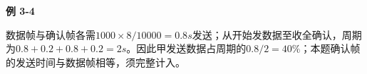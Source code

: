 {\color{ink}\bfseries 例 3-4}\par\vspace{1bp}数据帧与确认帧各需\(1000\times 8/\allowbreak{}10000=\allowbreak{}0.8s\)发送；从开始发数据至收全确认，周期为\(0.8+\allowbreak{}0.2+\allowbreak{}0.8+\allowbreak{}0.2=\allowbreak{}2s\)。因此甲发送数据占周期的\(0.8/\allowbreak{}2=\allowbreak{}40\%\)；本题确认帧的发送时间与数据帧相等，须完整计入。
